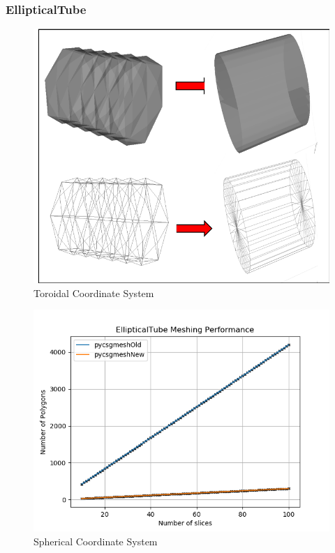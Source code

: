 \documentclass[12pt,a4paper]{article}
\begin{document}
\subsubsection{EllipticalTube}

\begin{figure}[h!]
\centering
\includegraphics[scale=0.5]{Images//Meshes//ellipticaltube.png}
\caption[width=\columnwidth]{Toroidal Coordinate System}
\label{conts}
\end{figure}

\begin{figure}[h!]
\centering
\includegraphics[scale=0.5]{Images//Quad_fits//EllipticalTube_quad.png}
\caption[width=\columnwidth]{Spherical Coordinate System}
\label{conts}
\end{figure}
\end{document}
